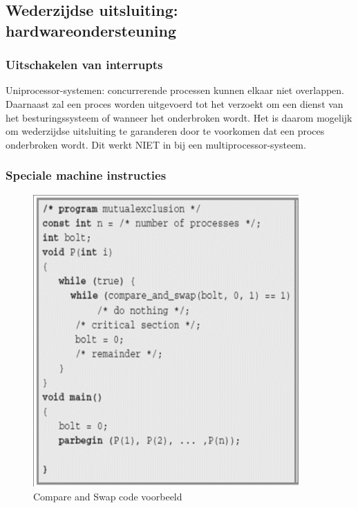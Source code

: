 \subsection{Wederzijdse uitsluiting: hardwareondersteuning}

\subsubsection{Uitschakelen van interrupts}

Uniprocessor-systemen: concurrerende processen kunnen elkaar niet overlappen. Daarnaast zal een proces worden uitgevoerd tot het verzoekt om een dienst van het besturingssysteem of wanneer het onderbroken wordt. Het is daarom mogelijk om wederzijdse uitsluiting te garanderen door te voorkomen dat een proces onderbroken wordt. Dit werkt NIET in bij een multiprocessor-systeem.

\subsubsection{Speciale machine instructies}

\begin{figure}[htp]
    \centering
            \includegraphics[width=4in]{img/compareandswap.png}
        \caption{Compare and Swap code voorbeeld}
    \label{fig:Compare and Swap code voorbeeld}
\end{figure}

\newpage

